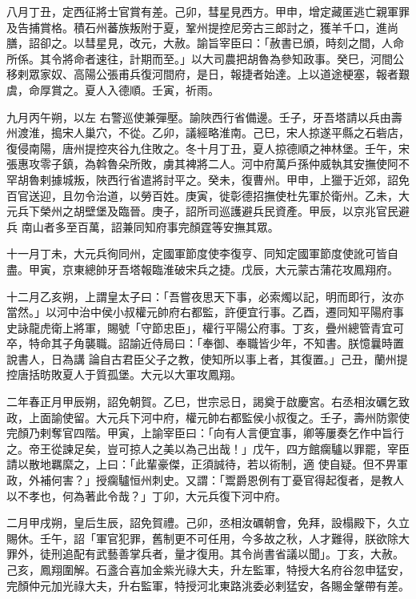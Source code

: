 \begin{pinyinscope}
 八月丁丑，定西征將士官賞有差。己卯，彗星見西方。甲申，增定藏匿逃亡親軍罪及告捕賞格。積石州蕃族叛附于夏，鞏州提控尼旁古三郎討之，獲羊千口，進尚膳，詔卻之。以彗星見，改元，大赦。諭旨宰臣曰：「赦書已頒，時刻之間，人命所係。其令將命者速往，計期而至。」以大司農把胡魯為參知政事。癸巳，河間公移剌眾家奴、高陽公張甫兵復河間府，是日，報捷者始達。上以道途梗塞，報者艱虞，命厚賞之。夏人入德順。壬寅，祈雨。



 九月丙午朔，以左
 右警巡使兼彈壓。諭陜西行省備邊。壬子，牙吾塔請以兵由壽州渡淮，搗宋人巢穴，不從。乙卯，議經略淮南。己巳，宋人掠遂平縣之石砦店，復侵南陽，唐州提控夾谷九住敗之。冬十月丁丑，夏人掠德順之神林堡。壬午，宋張惠攻零子鎮，為斡魯朵所敗，虜其裨將二人。河中府萬戶孫仲威執其安撫使阿不罕胡魯剌據城叛，陜西行省遣將討平之。癸未，復曹州。甲申，上獵于近郊，詔免百官送迎，且勿令治道，以勞百姓。庚寅，徙彰德招撫使杜先軍於衛州。乙未，大元兵下榮州之胡壁堡及臨晉。庚子，詔所司巡護避兵民資產。甲辰，以京兆官民避兵
 南山者多至百萬，詔兼同知府事完顏霆等安撫其眾。



 十一月丁未，大元兵徇同州，定國軍節度使李復亨、同知定國軍節度使訛可皆自盡。甲寅，京東總帥牙吾塔報臨淮破宋兵之捷。戊辰，大元蒙古蒲花攻鳳翔府。



 十二月乙亥朔，上謂皇太子曰：「吾嘗夜思天下事，必索燭以記，明而即行，汝亦當然。」以河中治中侯小叔權元帥府右都監，許便宜行事。乙酉，遷同知平陽府事史詠龍虎衛上將軍，賜號「守節忠臣」，權行平陽公府事。丁亥，疊州總管青宜可卒，特命其子角襲職。詔諭近侍局曰：「奉御、奉職皆少年，不知書。朕憶曩時置說書人，日為講
 論自古君臣父子之教，使知所以事上者，其復置。」己丑，蘭州提控唐括昉敗夏人于質孤堡。大元以大軍攻鳳翔。



 二年春正月甲辰朔，詔免朝賀。乙巳，世宗忌日，謁奠于啟慶宮。右丞相汝礪乞致政，上面諭使留。大元兵下河中府，權元帥右都監侯小叔復之。壬子，壽州防禦使完顏乃剌奪官四階。甲寅，上諭宰臣曰：「向有人言便宜事，卿等屢奏乞作中旨行之。帝王從諫足矣，豈可掠人之美以為己出哉！」戊午，四方館瘸驢以罪罷，宰臣請以散地羈縻之，上曰：「此輩豪傑，正須誠待，若以術制，適
 使自疑。但不畀軍政，外補何害？」授瘸驢恒州刺史。又謂：「鬻爵恩例有丁憂官得起復者，是教人以不孝也，何為著此令哉？」丁卯，大元兵復下河中府。



 二月甲戌朔，皇后生辰，詔免賀禮。己卯，丞相汝礪朝會，免拜，設榻殿下，久立賜休。壬午，詔「軍官犯罪，舊制更不可任用，今多故之秋，人才難得，朕欲除大罪外，徒刑追配有武藝善掌兵者，量才復用。其令尚書省議以聞」。丁亥，大赦。己亥，鳳翔圍解。石盞合喜加金紫光祿大夫，升左監軍，特授大名府谷忽申猛安，完顏仲元加光祿大夫，升右監軍，特授河北東路洮委必剌猛安，各賜金鞶帶有差。




\end{pinyinscope}
